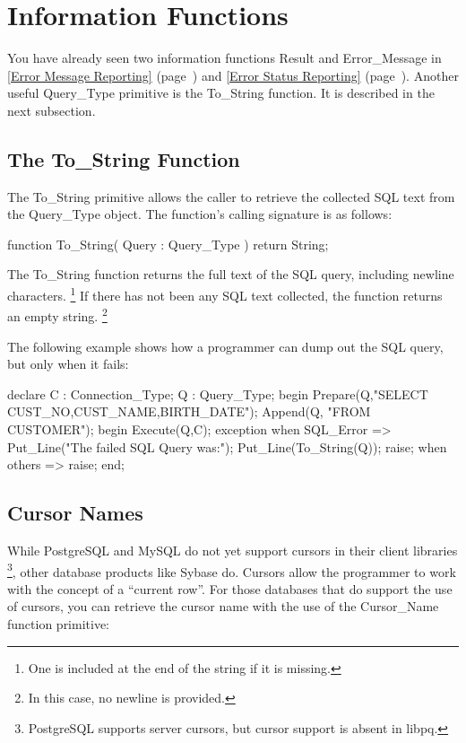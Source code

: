 \documentclass[english,letterpaper]{book}
\newcommand\Ref[1]{\textsection\ref{#1} (page~\pageref{#1})}
\begin{document}
\section{Information Functions}

You have already seen two information functions Result and Error\_Message
in \Ref{Error Message Reporting} and \Ref{Error Status Reporting}.
Another useful Query\_Type primitive is the To\_String function. It
is described in the next subsection.


\subsection{The To\_String Function}

The To\_String primitive allows the caller to retrieve the collected
SQL text from the Query\_Type object. The function's calling signature
is as follows:

\begin{Code}
function To_String(
   Query : Query_Type
) return String;
\end{Code}

The To\_String function returns the full text of the SQL query, including
newline characters.%
\footnote{One is included at the end of the string if it is missing.%
} If there has not been any SQL text collected, the
function returns an empty string.%
\footnote{In this case, no newline is provided.%
}

The following example shows how a programmer can dump out the SQL
query, but only when it fails:

\begin{Example}
declare
   C :   Connection_Type;
   Q :   Query_Type;
begin
   Prepare(Q,"SELECT CUST_NO,CUST_NAME,BIRTH_DATE");
   Append(Q, "FROM CUSTOMER");
   begin
      Execute(Q,C);
   exception
      when SQL_Error =>
         Put_Line("The failed SQL Query was:"); 
         Put_Line(To_String(Q));
         raise;
      when others =>
         raise;
   end;
\end{Example}

\subsection{Cursor Names\label{Cursor_Name}}

While PostgreSQL and MySQL do not yet support cursors in their client
libraries \footnote{PostgreSQL supports server cursors, but cursor support is absent in libpq.},
other database products like Sybase do. Cursors allow the programmer
to work with the concept of a ``current row''. For those databases
that do support the use of cursors, you can retrieve the cursor name
with the use of the Cursor\_Name function primitive:
\end{document}
